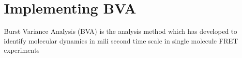 \section{Implementing BVA}


Burst Variance Analysis (BVA) is the analysis method which has developed to identify molecular dynamics in mili second time scale in single molecule FRET experiments~\cite{Torella_2011}